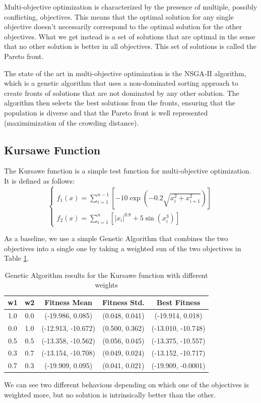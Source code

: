 Multi-objective optimization is characterized by the presence of multiple, possibly conflicting, objectives. This means that the optimal solution for any single objective doesn't necessarily correspond to the optimal solution for the other objectives. What we get instead is a set of solutions that are optimal in the sense that no other solution is better in all objectives. This set of solutions is called the Pareto front.

The state of the art in multi-objective optimization is the NSGA-II algorithm, which is a genetic algorithm that uses a non-dominated sorting approach to create fronts of solutions that are not dominated by any other solution. The algorithm then selects the best solutions from the fronts, ensuring that the population is diverse and that the Pareto front is well represented (maximimization of the crowding distance).

\subsection{Kursawe Function}
The Kursawe function is a simple test function for multi-objective optimization. It is defined as follows:
\begin{equation}
    \begin{cases}
        f_1(x) = \sum_{i=1}^{n-1} \left[ -10 \exp\left(-0.2\sqrt{x_i^2 + x_{i+1}^2}\right) \right] \\
        f_2(x) = \sum_{i=1}^{n} \left[ \left| x_i \right|^{0.8} + 5 \sin(x_i^3) \right]
    \end{cases}
\end{equation}

As a baseline, we use a simple Genetic Algorithm that combines the two objectives into a single one by taking a weighted sun of the two objectives in Table \ref{tab:kursawe_ga}.
\begin{table}[H]
    \centering
    \begin{tabular}{|c|c|c|c|c|}
        w1  & w2  & Fitness Mean       & Fitness Std.   & Best Fitness       \\ \hline
        1.0 & 0.0 & (-19.986, 0.085)   & (0.048, 0.041) & (-19.914, 0.018)   \\
        0.0 & 1.0 & (-12.913, -10.672) & (0.500, 0.362) & (-13.010, -10.748) \\
        0.5 & 0.5 & (-13.358, -10.562) & (0.056, 0.045) & (-13.375, -10.557) \\
        0.3 & 0.7 & (-13.154, -10.708) & (0.049, 0.024) & (-13.152, -10.717) \\
        0.7 & 0.3 & (-19.909, 0.095)   & (0.041, 0.021) & (-19.909, -0.0001) \\
    \end{tabular}
    \caption{Genetic Algorithm results for the Kursawe function with different weights}
    \label{tab:kursawe_ga}
\end{table}
We can see two different behavious depending on which one of the objectives is weighted more, but no solution is intrinsically better than the other.

